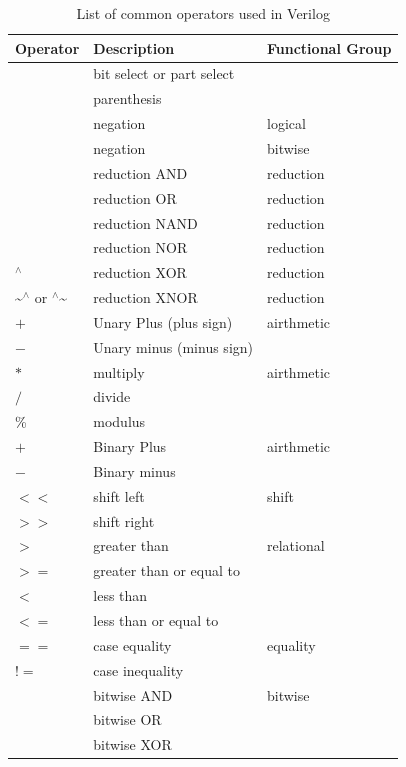 \documentclass[a4paper,10pt]{article}
\makeatletter
\def\zapcolorreset{\let\reset@color\relax\ignorespaces}
\def\colorrows#1{\noalign{\aftergroup\zapcolorreset#1}\ignorespaces}
\theoremstyle{mytheor}
\makeatother
\begin{document}
\begin{table}[h]
  \begin{center}
    \label{Table:operators-table}
    \caption{List of common operators used in Verilog}
    \renewcommand{\arraystretch}{1.1}
    \begin{tabularx}{.8\textwidth}{|X|X|X|} 
      \hline
      \rowcolor{greatblue}
      \color{white}  Operator & \color{white}Description & \color{white}Functional Group \\
      \hline
      \text{[]} & bit select or part select &  \\
      
      \hline
      \text{()} & parenthesis &  \\
      
      \hline
      \text{!} & negation &  logical\\
      \text{\textasciitilde} & negation &  bit\-wise\\
      \text{\&} & reduction AND & reduction \\
      \text{\textbar} & reduction OR & reduction \\
      \text{\textasciitilde\&} & reduction NAND & reduction \\
      \text{\textasciitilde\textbar} & reduction NOR & reduction \\
      $^\wedge$ & reduction XOR & reduction \\
      \textasciitilde$^\wedge$ or $^\wedge$\textasciitilde & reduction XNOR & reduction \\
      \hline
      $+$ & Unary Plus (plus sign) & airthmetic \\
      $-$ & Unary minus (minus sign) & \\
      \hline
      $*$ & multiply & airthmetic \\
      $/$ & divide &  \\
      \% & modulus &  \\
      \hline
      $+$ & Binary Plus & airthmetic \\
      $-$ & Binary minus &  \\
      \hline
      $<<$ & shift left & shift \\
      $>>$ & shift right &  \\
      \hline
      $>$ & greater than & relational \\
      $>=$  & greater than or equal to & \\
      $<$ & less than  & \\
      $<=$ & less than or equal to & \\
      \hline  
      $==$ & case equality & equality \\
      $!=$  & case inequality & \\
      \hline
      \text{\&} & bitwise AND & bitwise \\
      \text{\textbar} & bitwise OR & \\
      \text{$^\wedge$} & bitwise XOR & \\
      \hline
    \end{tabularx}
  \end{center}
\end{table}
\end{document}
